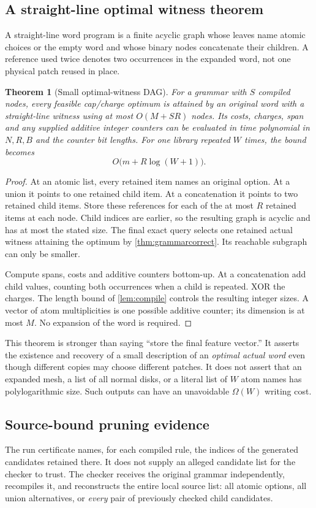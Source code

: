 \documentclass[11pt,a4paper]{article}
\newtheorem{theorem}{Theorem}[section]
\theoremstyle{definition}
\begin{document}
\subsection{A straight-line optimal witness theorem}
A straight-line word program is a finite acyclic graph whose leaves name atomic choices or the empty word and whose binary nodes concatenate their children. A reference used twice denotes two occurrences in the expanded word, not one physical patch reused in place.

\begin{theorem}[Small optimal-witness DAG]\label{thm:witness}
For a grammar with $S$ compiled nodes, every feasible cap/charge optimum is attained by an original word with a straight-line witness using at most $O(M+SR)$ nodes. Its costs, charges, span and any supplied additive integer counters can be evaluated in time polynomial in $N,R,B$ and the counter bit lengths. For one library repeated $W$ times, the bound becomes
\[
O\bigl(m+R\log(W+1)\bigr).
\]
\end{theorem}
\begin{proof}
At an atomic list, every retained item names an original option. At a union it points to one retained child item. At a concatenation it points to two retained child items. Store these references for each of the at most $R$ retained items at each node. Child indices are earlier, so the resulting graph is acyclic and has at most the stated size. The final exact query selects one retained actual witness attaining the optimum by \cref{thm:grammarcorrect}. Its reachable subgraph can only be smaller.

Compute spans, costs and additive counters bottom-up. At a concatenation add child values, counting both occurrences when a child is repeated. XOR the charges. The length bound of \cref{lem:compile} controls the resulting integer sizes. A vector of atom multiplicities is one possible additive counter; its dimension is at most $M$. No expansion of the word is required.
\end{proof}

This theorem is stronger than saying ``store the final feature vector.'' It asserts the existence and recovery of a small description of an \emph{optimal actual word} even though different copies may choose different patches. It does not assert that an expanded mesh, a list of all normal disks, or a literal list of $W$ atom names has polylogarithmic size. Such outputs can have an unavoidable $\Omega(W)$ writing cost.

\subsection{Source-bound pruning evidence}
The run certificate names, for each compiled rule, the indices of the generated candidates retained there. It does not supply an alleged candidate list for the checker to trust. The checker receives the original grammar independently, recompiles it, and reconstructs the entire local source list: all atomic options, all union alternatives, or \emph{every} pair of previously checked child candidates.
\end{document}
